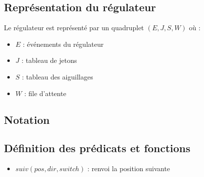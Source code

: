 \documentclass[12pt]{article}
\begin{document}
\subsection{Représentation du régulateur}
Le régulateur est représenté par un quadruplet $(E, J, S, W)$ où :
\begin{itemize}
    \item $E$ : événements du régulateur
    \item $J$ : tableau de jetons
    \item $S$ : tableau des aiguillages
    \item $W$ : file d'attente
\end{itemize}


\subsection{Notation}
\iffalse
On note
\\
$\mathbf{O}_{e}$ l'ensemble des ordres des événements
\vspace{0.3cm} \\
dict : $\mathbf{A} \rightarrow \mathbf{B}$ avec $\mathbf{A}$ l'ensemble des clés et $\mathbf{B}$ l'ensemble des valeurs
\\ $\mathbf{A} \times \mathbf{B}$ telque \{ $\langle k,v \rangle$ si $k_{j} \neq k_{i}$ \} \\
\vspace{0.1cm} \\
suppr(D,k) = \bracket{D \backslash \{\langle x,D[x] \rangle\} \text{ si } k = x}{D \text{ sinon}}
\\
\vspace{0.3cm} \\
E : dict avec \bracket{a \in \mathbf{A} | a = \langle id_{t}, numEv \rangle}{\mathbf{B} \subseteq \mathbf{O}_{e}}
\vspace{0.3cm} \\
W : dict avec \bracket{a \in \mathbf{A} | a = \langle id_{c}, val_{j} \rangle}{\mathbf{B} \subseteq \mathbf{N}}
\vspace{0.3cm} \\
Soit un tableau T, on note la mise à jour de T à la position i avec la valeur v par $\majtab{T}{i}{v}$ 
\fi

\subsection{Définition des prédicats et fonctions}

\begin{itemize}
    \item $suiv(pos, dir, switch)$ : renvoi la position suivante 
\end{itemize}
\end{document}
